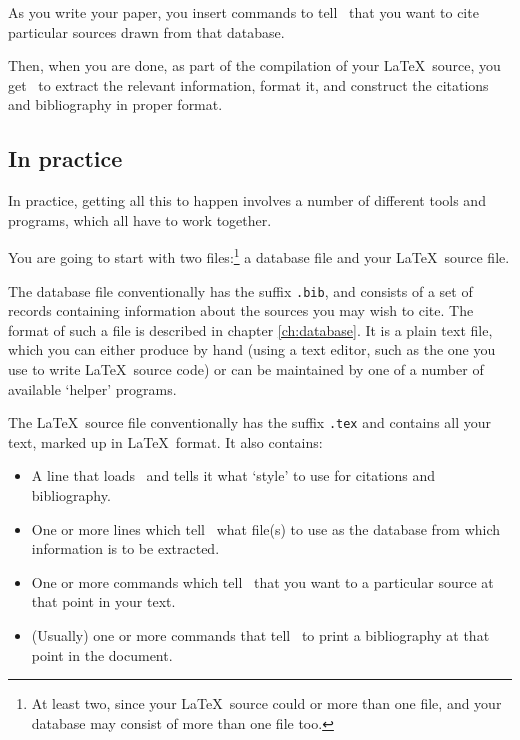 As you write your paper, you insert commands to tell \biblatex\ that
you want to cite particular sources drawn from that database.

Then, when you are done, as part of the compilation of your \LaTeX\
source, you get \biblatex\ to extract the relevant information, format
it, and construct the citations and bibliography in proper format.

\subsection{In practice}

In practice, getting all this to happen involves a number of different
tools and programs, which all have to work together.

You are going to start with two files:\footnote{At least two, since
  your \LaTeX\ source could \cs{include} or \cs{input} more than one
  file, and your database may consist of more than one file too.} a
database file and your \LaTeX\ source file.

The database file conventionally has the suffix \texttt{.bib}, and
consists of a set of records containing information about the sources
you may wish to cite. The format of such a file is described in
chapter \ref{ch:database}. It is a plain text file, which you can
either produce by hand (using a text editor, such as the one you use
to write \LaTeX\ source code) or can be maintained by one of a number
of available `helper' programs.\intref{Chapter \ref{ch:tools}}

The \LaTeX\ source file conventionally has the suffix \texttt{.tex}
and contains all your text, marked up in \LaTeX\ format. It also
contains:
\begin{itemize}
\item A line that
  loads \biblatex\ and tells it what `style' to use for citations and
  bibliography.
\item One or more lines
  which tell \biblatex\ what file(s) to use as the database from which
  information is to be extracted.
\item One or more commands which tell
  \biblatex\ that you want to \cs{cite} a particular source at that
  point in your text.
\item (Usually) one or more
  commands that tell \biblatex\ to print a bibliography at that point
  in the document.
\end{itemize}

